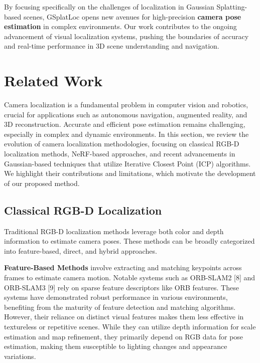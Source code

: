 \documentclass[twocolumn]{article} %
\begin{document}
By focusing specifically on the challenges of localization in Gaussian
Splatting-based scenes, GSplatLoc opens new avenues for high-precision
\textbf{camera pose estimation} in complex environments. Our work
contributes to the ongoing advancement of visual localization systems,
pushing the boundaries of accuracy and real-time performance in 3D scene
understanding and navigation.

\section{Related Work}\label{related-work}

Camera localization is a fundamental problem in computer vision and
robotics, crucial for applications such as autonomous navigation,
augmented reality, and 3D reconstruction. Accurate and efficient pose
estimation remains challenging, especially in complex and dynamic
environments. In this section, we review the evolution of camera
localization methodologies, focusing on classical RGB-D localization
methods, NeRF-based approaches, and recent advancements in
Gaussian-based techniques that utilize Iterative Closest Point (ICP)
algorithms. We highlight their contributions and limitations, which
motivate the development of our proposed method.

\subsection{Classical RGB-D
Localization}\label{classical-rgb-d-localization}

Traditional RGB-D localization methods leverage both color and depth
information to estimate camera poses. These methods can be broadly
categorized into feature-based, direct, and hybrid approaches.

\textbf{Feature-Based Methods} involve extracting and matching keypoints
across frames to estimate camera motion. Notable systems such as
ORB-SLAM2 {[}8{]} and ORB-SLAM3 {[}9{]} rely on sparse feature
descriptors like ORB features. These systems have demonstrated robust
performance in various environments, benefiting from the maturity of
feature detection and matching algorithms. However, their reliance on
distinct visual features makes them less effective in textureless or
repetitive scenes. While they can utilize depth information for scale
estimation and map refinement, they primarily depend on RGB data for
pose estimation, making them susceptible to lighting changes and
appearance variations.
\end{document}
